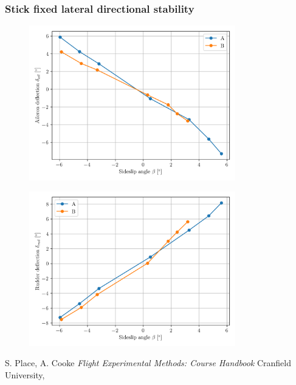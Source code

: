 \documentclass{article}
\begin{document}
\subsubsection{Stick fixed lateral directional stability}
\begin{figure}[H]
    \centering
    \includegraphics[width=0.8\textwidth]{Lat_Directional_Static_Stability_SHSS_2.png}
    \caption{}
    \label{fig:Lat_Directional_Static_Stability_SHSS_2}
\end{figure}

\begin{figure}[H]
    \centering
    \includegraphics[width=0.8\textwidth]{Lat_Directional_Static_Stability_SHSS_3.png}
    \caption{}
    \label{fig:Lat_Directional_Static_Stability_SHSS_3}
\end{figure}


\begin{thebibliography}{9}

  S. Place, A. Cooke
  \emph{Flight Experimental Methods: Course Handbook}
  Cranfield University,

\end{thebibliography}
\end{document}
